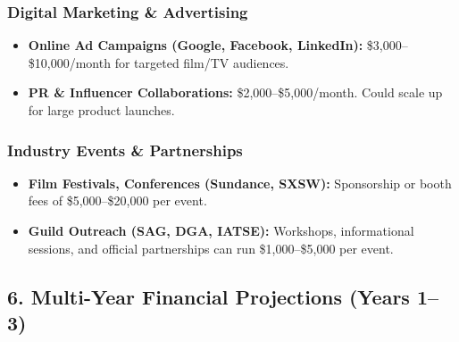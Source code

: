 \documentclass[11pt]{article}
\begin{document}
\subsubsection{Digital Marketing \& Advertising}
\begin{itemize}
    \item \textbf{Online Ad Campaigns (Google, Facebook, LinkedIn):} \$3,000--\$10,000/month for targeted film/TV audiences.
    \item \textbf{PR \& Influencer Collaborations:} \$2,000--\$5,000/month. Could scale up for large product launches.
\end{itemize}

\subsubsection{Industry Events \& Partnerships}
\begin{itemize}
    \item \textbf{Film Festivals, Conferences (Sundance, SXSW):} Sponsorship or booth fees of \$5,000--\$20,000 per event.
    \item \textbf{Guild Outreach (SAG, DGA, IATSE):} Workshops, informational sessions, and official partnerships can run \$1,000--\$5,000 per event.
\end{itemize}

\subsection{6. Multi-Year Financial Projections (Years 1--3)}

\begin{table}[H]
\centering
{}
\caption{High-Level P\&L Forecast (Years 1--3)}
\label{tab:fin-proj-1-3}
\end{table}
\end{document}
